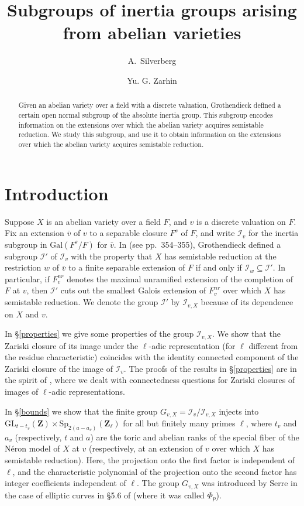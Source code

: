 \documentclass{amsart}
\title[Subgroups of inertia groups]
{Subgroups of inertia groups arising from abelian varieties}
\author[A.\ Silverberg]{A.\ Silverberg}
\author[Yu. G. Zarhin]{Yu. G. Zarhin}
\def\Z{{\mathbf Z}}
\def\Gal{\mathrm{Gal}}
\def\I{{\mathcal I}}
\def\II{{{\mathcal I}_{v,X}}}
\def\GL{\mathrm{GL}}
\def\Sp{\mathrm{Sp}}
\theoremstyle{definition}
\begin{document}
\begin{abstract}
Given an abelian variety over a field with a discrete valuation,
Grothendieck defined a certain open normal subgroup of the 
absolute inertia group. This  
subgroup encodes information on the extensions over which the 
abelian variety acquires semistable reduction. 
We study this subgroup, and use it to obtain information on the
extensions over which the abelian variety acquires
semistable reduction.
\end{abstract}

\maketitle
\baselineskip=15pt

\section{Introduction}

Suppose $X$ is an abelian variety over a field $F$, and
$v$ is a discrete valuation on $F$. Fix an extension ${\bar v}$
of $v$ to a separable closure $F^{s}$ of $F$, and write
$\I_{v}$ for the inertia subgroup in $\Gal(F^{s}/F)$ for ${\bar v}$.
In \cite{SGA} (see pp.~354--355), Grothendieck defined a subgroup $\I'$ of 
$\I_{v}$ with the property that $X$ has semistable reduction at 
the restriction $w$ of ${\bar v}$ to a finite separable extension of 
$F$ if and only if $\I_{w} \subseteq \I'$. 
In particular, if $F_{v}^{nr}$ denotes the maximal unramified
extension of the completion of $F$ at $v$, then $\I'$ cuts out
the smallest Galois extension of $F_{v}^{nr}$ over which $X$ has
semistable reduction. 
We denote the group $\I'$ by $\II$ because of its dependence
on $X$ and $v$. 

In \S\ref{properties} we give some 
properties of the group $\II$. 
We show that the Zariski closure of its image under the $\ell$-adic
representation (for $\ell$ different from the residue characteristic)
coincides with the identity connected component of
the Zariski closure of the image of $\I_{v}$. 
The proofs of the results in \S\ref{properties}
are in the spirit of \cite{Compositio},
where we dealt with connectedness questions for Zariski closures
of images of $\ell$-adic representations. 

In \S\ref{bounds} we show that the finite group 
$G_{v,X} = \I_{v}/\II$ injects into 
$\GL_{t-t_{v}}(\Z) \times \Sp_{2(a-a_{v})}(\Z_{\ell})$
for all but finitely many primes $\ell$, 
where $t_{v}$ and $a_{v}$ (respectively, $t$ and $a$)
are the toric and abelian ranks of the special fiber of
the N\'eron model of $X$ at $v$ (respectively, at an
extension of $v$ over which $X$ has semistable reduction).
Here, the projection onto the first factor is independent of $\ell$,
and the characteristic polynomial of the projection onto the
second factor has integer coefficients independent of $\ell$.
The group $G_{v,X}$ was introduced by Serre in the case
of elliptic curves in 
\S 5.6 of \cite{Serre72} (where it was called $\Phi_{p}$).
\end{document}
